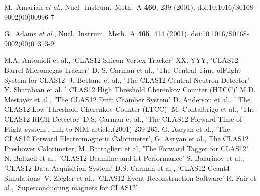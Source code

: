 \documentclass[final,3p,times,twocolumn,authoryear]{elsarticle}
\begin{document}
\begin{thebibliography}{99}
  M.~Amarian {\it et al.},
  Nucl.\ Instrum.\ Meth.\ A {\bf 460}, 239 (2001).
  doi:10.1016/S0168-9002(00)00996-7

  G.~Adams {\it et al.},
  Nucl.\ Instrum.\ Meth.\ A {\bf 465}, 414 (2001).
  doi:10.1016/S0168-9002(00)01313-9
  
 M.A. Antonioli et al., 'CLAS12 Silicon Vertex Tracker' 
 XX. YYY, 'CLAS12 Barrel Micromegas Tracker' 
 D. S. Carman et al., 'The Central Time-ofFlight System for CLAS12' 
 J. Bettane et al., 'The CLAS12 Central Neutron Detector'
 Y. Sharabian et al.  ' CLAS12 High Threshold Cherenkov Counter (HTCC)' 
 M.D. Mestayer et al., 'The CLAS12 Drift Chamber System'
 D. Anderson et al.. ' The CLAS12 Low Threshold Cherenkov Counter (LTCC)' 
 M. Contalbrigo et al., 'The CLAS12 RICH Detector'  
 D.S. Carman et al., 'The CLAS12 Forward Time of Flight system', link to NIM article.(2001) 239-265.
 G. Asryan et al., 'The CLAS12 Forward Electromagnetic Calorimeter', 
 G. Asryan et al.,  The CLAS12 Preshower Calorimeter,
 M. Battaglieri et al, 'The Forward Tagger for CLAS12' 
 N. Baltzell et al., 'CLAS12 Beamline and ist Performance' 
 S. Boiarinov et al., 'CLAS12 Data Acquisition System' 
 D.S. Carman et al., 'CLAS12 Geant4 Simulations' 
 V. Ziegler et al., 'CLAS12 Event Reconstruction Software' 
 R. Fair et al., 'Superconducting magnets for CLAS12'
\end{thebibliography}
\end{document}
